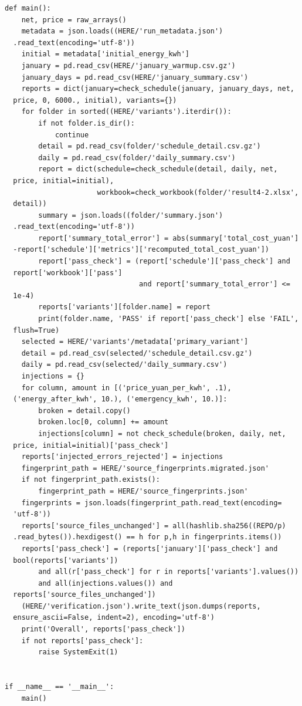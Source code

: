 \begin{verbatim}
def main():
    net, price = raw_arrays()
    metadata = json.loads((HERE/'run_metadata.json')
  .read_text(encoding='utf-8'))
    initial = metadata['initial_energy_kwh']
    january = pd.read_csv(HERE/'january_warmup.csv.gz')
    january_days = pd.read_csv(HERE/'january_summary.csv')
    reports = dict(january=check_schedule(january, january_days, net,
  price, 0, 6000., initial), variants={})
    for folder in sorted((HERE/'variants').iterdir()):
        if not folder.is_dir():
            continue
        detail = pd.read_csv(folder/'schedule_detail.csv.gz')
        daily = pd.read_csv(folder/'daily_summary.csv')
        report = dict(schedule=check_schedule(detail, daily, net,
  price, initial=initial),
                      workbook=check_workbook(folder/'result4-2.xlsx',
  detail))
        summary = json.loads((folder/'summary.json')
  .read_text(encoding='utf-8'))
        report['summary_total_error'] = abs(summary['total_cost_yuan']
  -report['schedule']['metrics']['recomputed_total_cost_yuan'])
        report['pass_check'] = (report['schedule']['pass_check'] and
  report['workbook']['pass']
                                and report['summary_total_error'] <=
  1e-4)
        reports['variants'][folder.name] = report
        print(folder.name, 'PASS' if report['pass_check'] else 'FAIL',
  flush=True)
    selected = HERE/'variants'/metadata['primary_variant']
    detail = pd.read_csv(selected/'schedule_detail.csv.gz')
    daily = pd.read_csv(selected/'daily_summary.csv')
    injections = {}
    for column, amount in [('price_yuan_per_kwh', .1),
  ('energy_after_kwh', 10.), ('emergency_kwh', 10.)]:
        broken = detail.copy()
        broken.loc[0, column] += amount
        injections[column] = not check_schedule(broken, daily, net,
  price, initial=initial)['pass_check']
    reports['injected_errors_rejected'] = injections
    fingerprint_path = HERE/'source_fingerprints.migrated.json'
    if not fingerprint_path.exists():
        fingerprint_path = HERE/'source_fingerprints.json'
    fingerprints = json.loads(fingerprint_path.read_text(encoding=
  'utf-8'))
    reports['source_files_unchanged'] = all(hashlib.sha256((REPO/p)
  .read_bytes()).hexdigest() == h for p,h in fingerprints.items())
    reports['pass_check'] = (reports['january']['pass_check'] and
  bool(reports['variants'])
        and all(r['pass_check'] for r in reports['variants'].values())
        and all(injections.values()) and
  reports['source_files_unchanged'])
    (HERE/'verification.json').write_text(json.dumps(reports,
  ensure_ascii=False, indent=2), encoding='utf-8')
    print('Overall', reports['pass_check'])
    if not reports['pass_check']:
        raise SystemExit(1)


if __name__ == '__main__':
    main()
\end{verbatim}

